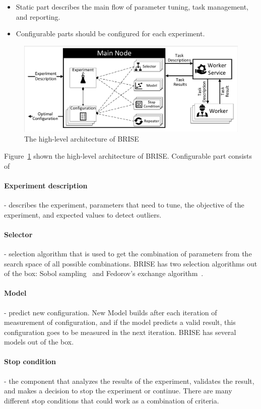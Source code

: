 \begin{itemize}
	\item Static part describes the main flow of parameter tuning, task management, and reporting.
	\item Configurable parts should be configured for each experiment.
\end{itemize}

\begin{figure}
	\centering
	\includegraphics[width=\textwidth]{images/BRISEarch.pdf}
	\caption[The high-level architecture of BRISE]{The high-level architecture of BRISE}
	\label{fig:BRISEarch}
\end{figure}

Figure~\ref{fig:BRISEarch} shown the high-level architecture of BRISE.
Configurable part consists of 
\paragraph{Experiment description} - describes the experiment, parameters that need to tune, the objective of the experiment, and expected values to detect outliers.
\paragraph{Selector} - selection algorithm that is used to get the combination of parameters from the search space of all possible combinations. BRISE has two selection algorithms out of the box: Sobol sampling~\cite{sobol99} and Fedorov's exchange algorithm~\cite{fedorov13}. 
\paragraph{Model} - predict new configuration. New Model builds after each iteration of measurement of configuration, and if the model predicts a valid result, this configuration goes to be measured in the next iteration. BRISE has several models out of the box.
\paragraph{Stop condition} - the component that analyzes the results of the experiment, validates the result, and makes a decision to stop the experiment or continue. There are many different stop conditions that could work as a combination of criteria.
